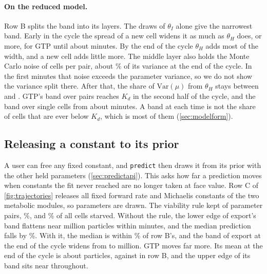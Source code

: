 \paragraph{On the reduced model.} Row B splits the band into its layers. The draws of $\theta_I$
alone give the narrowest band. Early in the cycle the spread of a new cell widens it as much as
$\theta_H$ does, or more, for GTP until about  minutes. By the end of the
cycle $\theta_H$ adds most of the width, and a new cell adds little more. The middle layer also holds the Monte Carlo noise of  cells per
pair, about \% of its variance at the end of the cycle. In the first 
minutes that noise exceeds the parameter variance, so we do not show the variance split there.
After that, the share of $\mathrm{Var}(\mu)$ from $\theta_H$ stays between  and
. GTP's band over pairs reaches $K_d$ in the second half of the cycle, and the band
over single cells from about  minutes. A band at each time is not the share of
cells that are ever below $K_d$, which is most of them (\cref{sec:modelform}).

\subsection{Releasing a constant to its prior}
\label{sec:release}

A user can free any fixed constant, and \texttt{predict} then draws it from its prior with
the other held parameters (\cref{sec:predictapi}). This asks how far a prediction moves when
constants the fit never reached are no longer taken at face value. Row C of
\cref{fig:trajectories} releases all  fixed forward rate and
Michaelis constants of the two metabolic modules, so  parameters are drawn. The viability
rule kept  of  parameter pairs, \%, and
\% of all cells starved. Without the rule, the lower edge of export's band
flattens near  million particles within minutes, and the median prediction falls by
\%. With it, the median is within \% of row B's, and the band of
export at the end of the cycle widens from  to  million. GTP moves
far more. Its mean at the end of the cycle is about  particles, against
 in row B, and the upper edge of its band sits near  throughout.

